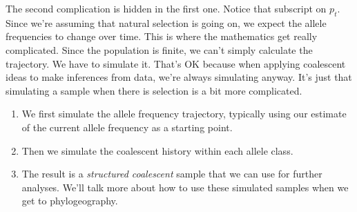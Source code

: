 The second complication is hidden in the first one. Notice that
subscript on $p_t$. Since we're assuming that natural selection is
going on, we expect the allele frequencies to change over time. This
is where the mathematics get really complicated. Since the population
is finite, we can't simply calculate the trajectory. We have to
simulate it. That's OK because when applying coalescent ideas to make
inferences from data, we're always simulating anyway. It's just that
simulating a sample when there is selection is a bit more complicated.

\begin{enumerate}

  \item We first simulate the allele frequency trajectory, typically
    using our estimate of the current allele frequency as a starting
    point.

  \item Then we simulate the coalescent history within each allele
    class.

  \item The result is a {\it structured coalescent}  
    sample that we can use for further analyses. We'll talk more about
    how to use these simulated samples when we get to phylogeography.
    
  \end{enumerate}

